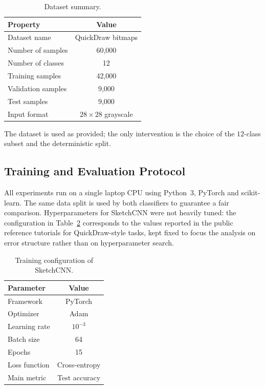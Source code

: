 \documentclass[10pt,twocolumn,a4paper]{article}
\begin{document}
\begin{table}[h]
	\centering
	\caption{Dataset summary.}
	\label{tab:dataset}
	\begin{tabular}{|l|c|}
		\hline
		\textbf{Property} & \textbf{Value} \\
		\hline
		Dataset name & QuickDraw bitmaps \\
		Number of samples & 60,000 \\
		Number of classes & 12 \\
		Training samples & 42,000 \\
		Validation samples & 9,000 \\
		Test samples & 9,000 \\
		Input format & $28\times28$ grayscale \\
		\hline
	\end{tabular}
\end{table}

The dataset is used as provided; the only intervention is the choice of the
$12$-class subset and the deterministic split.

\subsection{Training and Evaluation Protocol}

All experiments run on a single laptop CPU using Python~3, PyTorch and
scikit-learn. The same data split is used by both classifiers to guarantee a
fair comparison. Hyperparameters for SketchCNN were not heavily tuned: the
configuration in Table~\ref{tab:training} corresponds to the values reported
in the public reference tutorials for QuickDraw-style tasks, kept fixed to
focus the analysis on error structure rather than on hyperparameter search.

\begin{table}[h]
	\centering
	\caption{Training configuration of SketchCNN.}
	\label{tab:training}
	\begin{tabular}{|l|c|}
		\hline
		\textbf{Parameter} & \textbf{Value} \\
		\hline
		Framework & PyTorch \\
		Optimizer & Adam \\
		Learning rate & $10^{-3}$ \\
		Batch size & 64 \\
		Epochs & 15 \\
		Loss function & Cross-entropy \\
		Main metric & Test accuracy \\
		\hline
	\end{tabular}
\end{table}
\end{document}
